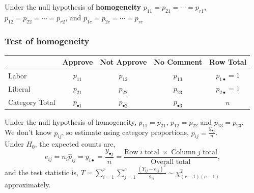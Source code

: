 \documentclass[a4paper]{article}
\begin{document}
Under the null hypothesis of \textbf{homogeneity} \textcolor{myred}{\( p_{11} = p_{21} = \dotsb  = p_{r1} \)}, \textcolor{mygreen}{\( p_{12} = p_{22} = \dotsb  = p_{r2} \)}, and \textcolor{mygreen}{\( p_{1c} = p_{2c} = \dotsb  = p_{rc} \)}
\subsubsection{Test of homogeneity}
\begin{table}[H]
	\centering
	\begin{tabular}{@{}lcccc@{}}
	\toprule
				   & Approve  								& Not Approve 		  					  & No Comment				  				 & Row Total               \\ \midrule
	Labor   	   & \textcolor{myred}{\( p_{11} \)} 		& \textcolor{mygreen}{\( p_{12} \) }		  & \textcolor{mygreen}{\( p_{13} \)} 		 & \( p_{1 \bullet} = 1 \) \\
	Liberal   	   & \textcolor{myred}{\( p_{21} \)} 		& \textcolor{mygreen}{\( p_{22} \) }		  & \textcolor{mygreen}{\( p_{23} \)} 		 & \( p_{2 \bullet} = 1 \) \\ \midrule
	Category Total & \textcolor{myred}{\( p_{\bullet 1} \)} & \textcolor{mygreen}{\( p_{\bullet 2} \)} & \textcolor{mygreen}{\( p_{\bullet 3} \)} & \( n \) 				   \\ \bottomrule
	\end{tabular}
\end{table}
Under the null hypothesis of homogeneity, \textcolor{myred}{\( p_{11} = p_{21} \)}, \textcolor{myblue}{\( p_{12} = p_{22} \)} and \textcolor{mygreen}{\( p_{13} = p_{23} \)}.\\
We don't know \( p_{ij} \), so estimate using category proportions, \( \hat{p}_{ij} = \frac{y_{\bullet j}}{n} \).\\
Under \( H_0 \), the expected counts are,
\[
	e_{ij} = n_i \hat{p}_{ij} = y_{i \bullet} = \frac{y_{\bullet j}}{n} = \frac{\text{Row}\;i\;\text{total}\;\times\;\text{Column}\;j\;\text{total}}{\text{Overall total}},
\]
and the test statistic is, \( T = \sum\limits_{i=1}^{r} \sum\limits_{j=1}^{c} \frac{(Y_{ij} - e_{ij})^2}{e_{ij}} \sim \chi^2_{(r-1)(c-1)} \) approximately. 
\end{document}
